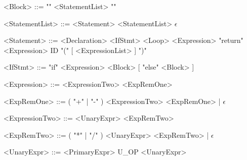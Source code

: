 \documentclass{article}
\begin{document}
\begin{grammar}
    <Block>             ::=     "{" <StatementList> "}"

    <StatementList>     ::=     <Statement> <StatementList> 
                        \alt    $\epsilon$

    <Statement>         ::=     <Declaration> 
                        \alt    <IfStmt> 
                        \alt    <Loop> 
                        \alt    <Expression>
                        \alt    "return" <Expression>  
                        \alt    ID "(" [ <ExpressionList> ] ")"

    
    <IfStmt>            ::=     "if" <Expression> <Block> [ "else" <Block> ]


    <Expression>        ::=     <ExpressionTwo> <ExpRemOne>

    <ExpRemOne>         ::=     ( "+" | "-" ) <ExpressionTwo> <ExpRemOne> | $\epsilon$

    <ExpressionTwo>     ::=     <UnaryExpr> <ExpRemTwo>

    <ExpRemTwo>         ::=     ( "*" | "/" ) <UnaryExpr> <ExpRemTwo> | $\epsilon$     


    <UnaryExpr>         ::=     <PrimaryExpr> 
                        \alt    U_OP <UnaryExpr>    %


\end{grammar}
\end{document}
